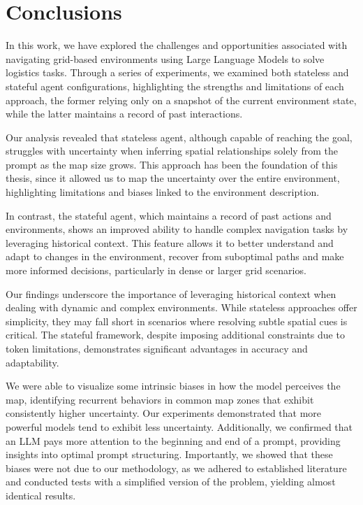 \chapter{Conclusions}
\label{cha:conclusions}

In this work, we have explored the challenges and opportunities associated with navigating
grid-based environments using Large Language Models to solve logistics tasks.
Through a series of experiments, we examined both stateless and stateful agent configurations,
highlighting the strengths and limitations of each approach, the former relying only
on a snapshot of the current environment state, while the latter maintains a
record of past interactions.

Our analysis revealed that stateless agent, although capable of reaching the goal,
struggles with uncertainty when inferring spatial relationships solely from the
prompt as the map size grows. This approach has been the foundation of this thesis,
since it allowed us to map the uncertainty over the entire environment, highlighting
limitations and biases linked to the environment description.

In contrast, the stateful agent, which maintains a record of past actions and environments,
shows an improved ability to handle complex navigation tasks by leveraging
historical context. This feature allows it to better understand and adapt to changes
in the environment, recover from suboptimal paths and make more informed
decisions, particularly in dense or larger grid scenarios.

Our findings underscore the importance of leveraging historical context when dealing
with dynamic and complex environments. While stateless approaches offer
simplicity, they may fall short in scenarios where resolving subtle spatial cues
is critical. The stateful framework, despite imposing additional constraints due
to token limitations, demonstrates significant advantages in accuracy and
adaptability.

We were able to visualize some intrinsic biases in how the model perceives the
map, identifying recurrent behaviors in common map zones that exhibit consistently
higher uncertainty. Our experiments demonstrated that more powerful models tend
to exhibit less uncertainty. Additionally, we confirmed that an LLM pays more
attention to the beginning and end of a prompt, providing insights into optimal prompt
structuring. Importantly, we showed that these biases were not due to our methodology,
as we adhered to established literature and conducted tests with a simplified
version of the problem, yielding almost identical results.

